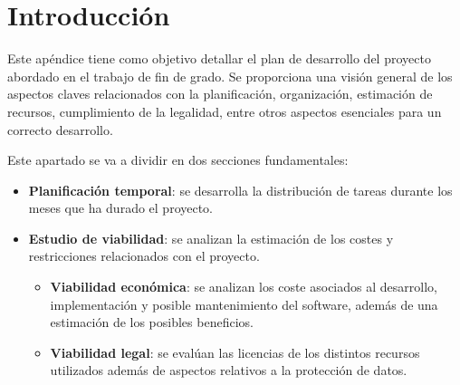 
\section{Introducción}
\label{sec:Introduccion}
Este apéndice tiene como objetivo detallar el plan de desarrollo del proyecto abordado en el trabajo de fin de grado. Se proporciona una visión general de los aspectos claves relacionados con la planificación, organización, estimación de recursos, cumplimiento de la legalidad, entre otros aspectos esenciales para un correcto desarrollo.

Este apartado se va a dividir en dos secciones fundamentales:
\begin{itemize}
    \item \textbf{Planificación temporal}: se desarrolla la distribución de tareas durante los meses que ha durado el proyecto.
    \item \textbf{Estudio de viabilidad}: se analizan la estimación de los costes y restricciones relacionados con el proyecto.
    \begin{itemize}
        \item \textbf{Viabilidad económica}: se analizan los coste asociados al desarrollo, implementación y posible mantenimiento del software, además de una estimación de los posibles beneficios.
        \item \textbf{Viabilidad legal}: se evalúan las licencias de los distintos recursos utilizados además de aspectos relativos a la protección de datos.
    \end{itemize}
\end{itemize}

